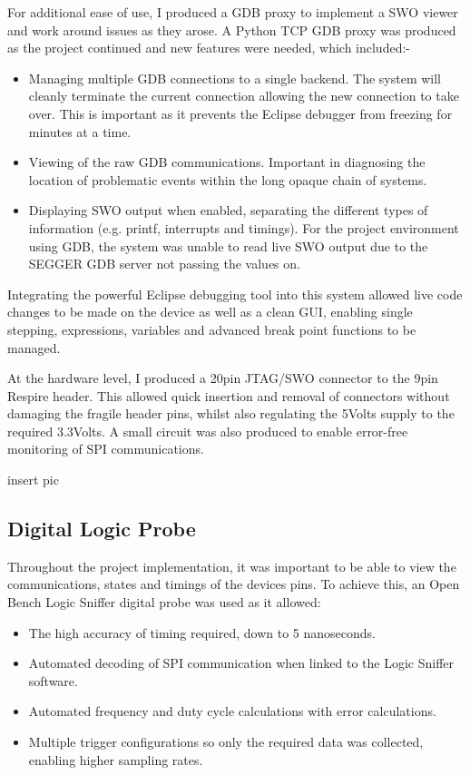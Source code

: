 For additional ease of use, I produced a GDB proxy to implement a SWO viewer and work around
issues as they arose. A Python TCP GDB proxy was produced as the project continued and new
features were needed, which included:-
\begin{itemize}
  \item Managing multiple GDB connections to a single backend. The system will cleanly terminate
        the current connection allowing the new connection to take over. This is important as it
        prevents the Eclipse debugger from freezing for minutes at a time.
  \item Viewing of the raw GDB communications. Important in diagnosing the location of
        problematic events within the long opaque chain of systems.
  \item Displaying SWO output when enabled, separating the different types of information (e.g.
        printf, interrupts and timings). For the project environment using GDB, the system was
        unable to read live SWO output due to the SEGGER GDB server not passing the values on.
\end{itemize}


Integrating the powerful Eclipse debugging tool into this system allowed live code changes to be
made on the device as well as a clean GUI, enabling single stepping, expressions, variables and
advanced break point functions to be managed.


At the hardware level, I produced a 20pin JTAG/SWO connector to the 9pin Respire header. This
allowed quick insertion and removal of connectors without damaging the fragile header pins, whilst
also regulating the 5Volts supply to the required 3.3Volts. A small circuit was also produced to
enable error-free monitoring of SPI communications.

{insert pic}


\subsection{Digital Logic Probe}
Throughout the project implementation, it was important to be able to view the communications,
states and timings of the devices pins. To achieve this, an Open Bench Logic Sniffer digital probe was
used as it allowed:
\begin{itemize}
  \item The high accuracy of timing required, down to 5 nanoseconds.
  \item Automated decoding of SPI communication when linked to the Logic Sniffer software.
  \item Automated frequency and duty cycle calculations with error calculations.
  \item Multiple trigger configurations so only the required data was collected, enabling higher
        sampling rates.
\end{itemize}

